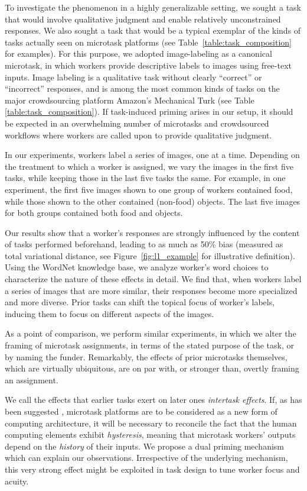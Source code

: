 \documentclass{sigchi}
\begin{document}
To investigate the phenomenon in a
highly generalizable setting, we sought a task that would involve 
qualitative judgment and enable relatively unconstrained responses. 
We also sought a task that would be a typical exemplar of the kinds of
tasks actually seen on microtask platforms (see 
Table~\ref{table:task_composition} for examples).  For this purpose, we 
adopted
image-labeling as a canonical microtask, in which workers provide 
descriptive labels to images using free-text inputs.  Image labeling is
a qualitative task without clearly ``correct'' or ``incorrect'' responses,
and is among the most common kinds of tasks on the major crowdsourcing
platform Amazon's Mechanical Turk (see Table \ref{table:task_composition}).  If task-induced priming arises in our 
setup, it should be expected in an overwhelming number of microtasks and 
crowdsourced workflows where workers are called upon to provide qualitative
judgment.

In our experiments, workers label a series of images, one at a time.
Depending on the treatment to which a worker is assigned, we vary the
images in the first five tasks, while keeping those in the last five tasks 
the same.  For example, in one experiment, the first five images shown to
one group of workers contained food, while those shown to the other 
contained (non-food) objects.  The last five images for both
groups contained both food and objects.

Our results show that a worker's responses are strongly influenced by 
the content of tasks performed beforehand, leading to as much as 50\%
bias (measured as total variational distance, 
see Figure~\ref{fig:l1_example} for illustrative definition).  
Using the WordNet 
knowledge base, we analyze worker's word choices to characterize 
the nature of these effects in detail.  We find that, when workers 
label a series of images that are more similar, their responses become 
more specialized and more diverse.  
Prior tasks can shift the topical focus of 
worker's labels, inducing them to focus on different aspects of the images.

As a point of comparison, we perform similar experiments, in which we
alter the framing of microtask assignments, in terms of the stated purpose
of the task, or by naming the funder.
Remarkably, the effects of prior microtasks themselves,
which are virtually ubiquitous, are on par with, or stronger than, 
overtly framing an assignment.

We call the effects that earlier tasks exert on later ones 
\textit{intertask effects}.  If, as has been suggested \cite{5543192}, 
microtask platforms are to be considered as a new form of computing 
architecture, it will be necessary to reconcile the fact that the human 
computing elements exhibit \textit{hysteresis}, 
meaning that microtask workers' outputs 
depend on the \textit{history} of their inputs.
We propose a dual priming mechanism which can explain our
observations.  Irrespective of the underlying mechanism, this 
very strong effect might be exploited in task design to tune worker 
focus and acuity.
\end{document}
